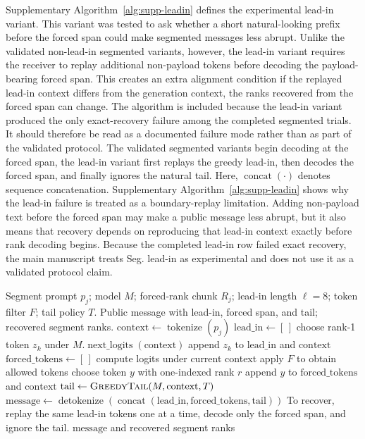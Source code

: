 \documentclass[fleqn,10pt]{wlscirep}
\newcommand{\Tokenize}{\operatorname{tokenize}}
\newcommand{\Detokenize}{\operatorname{detokenize}}
\newcommand{\NextLogits}{\operatorname{next\_logits}}
\begin{document}
Supplementary Algorithm~\ref{alg:supp-leadin} defines the experimental lead-in variant. This variant was tested to ask whether a short natural-looking prefix before the forced span could make segmented messages less abrupt. Unlike the validated non-lead-in segmented variants, however, the lead-in variant requires the receiver to replay additional non-payload tokens before decoding the payload-bearing forced span. This creates an extra alignment condition if the replayed lead-in context differs from the generation context, the ranks recovered from the forced span can change.
The algorithm is included because the lead-in variant produced the only exact-recovery failure among the completed segmented trials. It should therefore be read as a documented failure mode rather than as part of the validated protocol. The validated segmented variants begin decoding at the forced span, the lead-in variant first replays the greedy lead-in, then decodes the forced span, and finally ignores the natural tail.
Here, \(\operatorname{concat}(\cdot)\) denotes sequence concatenation. Supplementary Algorithm~\ref{alg:supp-leadin} shows why the lead-in failure is treated as a boundary-replay limitation. Adding non-payload text before the forced span may make a public message less abrupt, but it also means that recovery depends on reproducing that lead-in context exactly before rank decoding begins. Because the completed lead-in row failed exact recovery, the main manuscript treats Seg. lead-in as experimental and does not use it as a validated protocol claim.
\setcounter{algorithm}{0}
\begin{algorithm}[H]
\caption{Experimental lead-in segmented variant}
\label{alg:supp-leadin}
\begin{algorithmic}[1]
\Require Segment prompt \(p_j\); model \(M\); forced-rank chunk \(R_j\); lead-in length \(\ell=8\); token filter \(F\); tail policy \(T\).
\Ensure Public message with lead-in, forced span, and tail; recovered segment ranks.
\State \(\mathrm{context} \gets \Tokenize(p_j)\)
\State \(\mathrm{lead\_in} \gets [\,]\)
    \State choose rank-1 token \(z_k\) under \(M.\NextLogits(\mathrm{context})\)
    \State append \(z_k\) to \(\mathrm{lead\_in}\) and \(\mathrm{context}\)
\EndFor
\State \(\mathrm{forced\_tokens} \gets [\,]\)
    \State compute logits under current context
    \State apply \(F\) to obtain allowed tokens
    \State choose token \(y\) with one-indexed rank \(r\)
    \State append \(y\) to \(\mathrm{forced\_tokens}\) and \(\mathrm{context}\)
\EndFor
\State \(\mathrm{tail} \gets \Call{GreedyTail}{M,\mathrm{context},T}\)
\State \(\mathrm{message} \gets \Detokenize(\operatorname{concat}(\mathrm{lead\_in},\mathrm{forced\_tokens},\mathrm{tail}))\)
\Statex
\State To recover, replay the same lead-in tokens one at a time, decode only the forced span, and ignore the tail.
\State \Return \(\mathrm{message}\) and recovered segment ranks
\end{algorithmic}
\end{algorithm}
\end{document}
